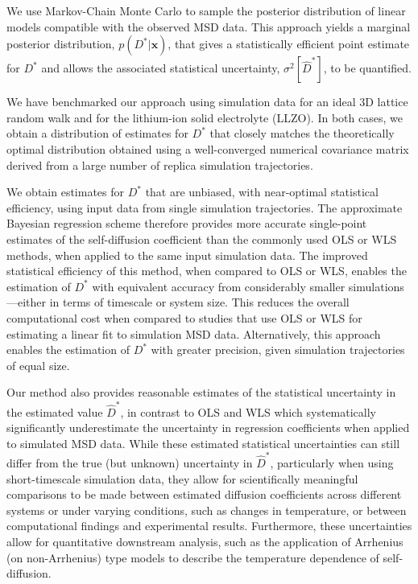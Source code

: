 \documentclass[reprint,superscriptaddress,nobibnotes,amsmath,amssymb,aps,prx,hidelinks]{revtex4-2}
\newcommand{\oMSD}{\ensuremath{\bm{x}}}
\newcommand{\prob}[1]{\ensuremath{p(#1)}}
\newcommand{\Dest}{\ensuremath{\widehat{D}^*}}
\newcommand{\D}{\ensuremath{D^*}}
\newcommand{\var}[1]{\ensuremath{\sigma^2[#1]}}
\begin{document}
We use Markov-Chain Monte Carlo to sample the posterior distribution of linear models compatible with the observed MSD data.
This approach yields a marginal posterior distribution, $\prob{\D | \oMSD}$, that gives a statistically efficient point estimate for $\D$ and allows the associated statistical uncertainty, $\var{\Dest}$, to be quantified.

We have benchmarked our approach using simulation data for an ideal 3D lattice random walk and for the lithium-ion solid electrolyte  (LLZO).
In both cases, we obtain a distribution of estimates for $\D$ that closely matches the theoretically optimal distribution obtained using a well-converged numerical covariance matrix derived from a large number of replica simulation trajectories.

We obtain estimates for $\D$ that are unbiased, with near-optimal statistical efficiency, using input data from single simulation trajectories.
The approximate Bayesian regression scheme therefore provides more accurate single-point estimates of the self-diffusion coefficient than the commonly used OLS or WLS methods, when applied to the same input simulation data.
The improved statistical efficiency of this method, when compared to OLS or WLS, enables the estimation of $\D$ with equivalent accuracy from considerably smaller simulations---either in terms of timescale or system size. 
This reduces the overall computational cost when compared to studies that use OLS or WLS for estimating a linear fit to simulation MSD data.
Alternatively, this approach enables the estimation of $\D$ with greater precision, given simulation trajectories of equal size.

Our method also provides reasonable estimates of the statistical uncertainty in the estimated value $\Dest$, in contrast to OLS and WLS which systematically significantly underestimate the uncertainty in regression coefficients when applied to simulated MSD data. 
While these estimated statistical uncertainties can still differ from the true (but unknown) uncertainty in $\Dest$, particularly when using short-timescale simulation data, they allow for scientifically meaningful comparisons to be made between estimated diffusion coefficients across different systems or under varying conditions, such as changes in temperature, or between computational findings and experimental results.
Furthermore, these uncertainties allow for quantitative downstream analysis, such as the application of Arrhenius (on non-Arrhenius) type models to describe the temperature dependence of self-diffusion.
\end{document}
